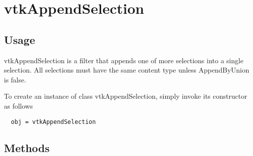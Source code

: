 \section{vtkAppendSelection}

\subsection{Usage}

 vtkAppendSelection is a filter that appends one of more selections into
 a single selection.  All selections must have the same content type unless
 AppendByUnion is false.

To create an instance of class vtkAppendSelection, simply
invoke its constructor as follows
\begin{verbatim}
  obj = vtkAppendSelection
\end{verbatim}
\subsection{Methods}

